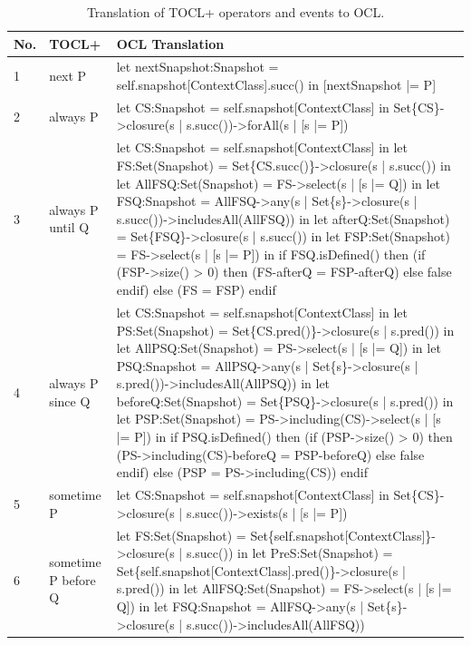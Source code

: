 \begin{longtable}{|>{\footnotesize}p{0.6cm}|>{\scriptsize\raggedright\arraybackslash}p{4cm}|>{\scriptsize\raggedright\arraybackslash}p{\dimexpr\textwidth-4.6cm-4\tabcolsep-3\arrayrulewidth\relax}|}
    \caption{Translation of TOCL+ operators and events to OCL.}
    \label{tab:TOCL2OCL} \\
    \hline
    \textbf{No.} & \textbf{TOCL+} & \textbf{OCL Translation} \\
    \hline
    1 & 
    next P &
    let nextSnapshot:Snapshot = self.snapshot[ContextClass].succ() in [nextSnapshot |= P] \\
    \hline
    2 &
    always P &
    let CS:Snapshot = self.snapshot[ContextClass] in Set\{CS\}->closure(s | s.succ())->forAll(s | [s |= P]) \\
    \hline  
    3 &
    always P until Q &
    let CS:Snapshot = self.snapshot[ContextClass]
    in let FS:Set(Snapshot) = Set\{CS.succ()\}->closure(s | s.succ())
    in let AllFSQ:Set(Snapshot) = FS->select(s | [s |= Q])
    in let FSQ:Snapshot = AllFSQ->any(s | Set\{s\}->closure(s | s.succ())->includesAll(AllFSQ))
    in let afterQ:Set(Snapshot) = Set\{FSQ\}->closure(s | s.succ())
    in let FSP:Set(Snapshot) = FS->select(s | [s |= P])
    in if FSQ.isDefined() then (if (FSP->size() > 0) then (FS-afterQ = FSP-afterQ) else false endif) else (FS = FSP) endif \\
    \hline
    4 &
    always P since Q &
    let CS:Snapshot = self.snapshot[ContextClass]
    in let PS:Set(Snapshot) = Set\{CS.pred()\}->closure(s | s.pred())
    in let AllPSQ:Set(Snapshot) = PS->select(s | [s |= Q])
    in let PSQ:Snapshot = AllPSQ->any(s | Set\{s\}->closure(s | s.pred())->includesAll(AllPSQ))
    in let beforeQ:Set(Snapshot) = Set\{PSQ\}->closure(s | s.pred())
    in let PSP:Set(Snapshot) = PS->including(CS)->select(s | [s |= P])
    in if PSQ.isDefined() then (if (PSP->size() > 0) then (PS->including(CS)-beforeQ = PSP-beforeQ) else false endif) else (PSP = PS->including(CS)) endif \\
    \hline
    5 &
    sometime P &
    let CS:Snapshot = self.snapshot[ContextClass] in Set\{CS\}->closure(s | s.succ())->exists(s | [s |= P]) \\
    \hline
    6 &
    sometime P before Q &
    let FS:Set(Snapshot) = Set\{self.snapshot[ContextClass]\}->closure(s | s.succ())
    in let PreS:Set(Snapshot) = Set\{self.snapshot[ContextClass].pred()\}->closure(s | s.pred())
    in let AllFSQ:Set(Snapshot) = FS->select(s | [s |= Q])
    in let FSQ:Snapshot = AllFSQ->any(s | Set\{s\}->closure(s | s.succ())->includesAll(AllFSQ))

\end{longtable}
